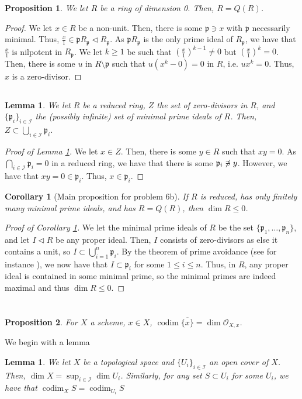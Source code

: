 \documentclass[english,letter,doublesided]{article}
\newcommand{\OO}{\mathcal{O}}
\newcommand{\pfr}{\mathfrak{p}}
\newcommand{\Ical}{\mathcal{I}}
\newenvironment{subproof}[1][\proofname]{%
	\renewcommand{\qedsymbol}{$\blacksquare$}%
	\begin{proof}[#1]%
	}{%
	\end{proof}%
}
\newcommand{\prob}[1]{\setcounter{section}{#1-1}\section{}}
\newcommand{\prt}[1]{\setcounter{subsection}{#1-1}\subsection{}}
\newtheorem{cor}[thm]{Corollary}
\newtheorem{lemma}[thm]{Lemma}
\newtheorem*{prop*}{Proposition}
\theoremstyle{remark}
\theoremstyle{definition}
\newcommand{\cl}{\overline}
\DeclareMathOperator{\codim}{codim}
\begin{document}

\prob{6}
\prt{1}
\begin{prop*}
We let $R$ be a ring of dimension 0. Then, $R=Q(R)$. 
\end{prop*}
\begin{proof}
	We let $x\in R$ be a non-unit. Then, there is some $\pfr\ni x$ with $\pfr$ necessarily minimal. Thus, $\frac{x}{1}\in \pfr R_\pfr\triangleleft R_\pfr$. As $\pfr R_\pfr$ is the only prime ideal of $R_\pfr$, we have that $\frac{x}{1}$ is nilpotent in $R_\pfr$. We let $k\geq 1$ be such that $(\frac{x}{1})^{k-1}\neq 0$ but $(\frac{x}{1})^k=0$. Then, there is some $u$ in $R\setminus \pfr$ such that $u(x^k-0)=0$ in $R$, i.e. $ux^k=0$. Thus, $x$ is a zero-divisor.
\end{proof}
\prt{2}
\begin{lemma}
	We let $R$ be a reduced ring, $Z$ the set of zero-divisors in $R$, and $\{\pfr_i\}_{i\in \Ical}$ the (possibly infinite) set of minimal prime ideals of $R$. Then, $Z\subset \bigcup_{i\in \Ical}\pfr_i$. \label{6blem}
\end{lemma}
\begin{subproof}[Proof of Lemma \ref{6blem}]
We let $x\in Z$. Then, there is some $y\in R$ such that $xy=0$. As $\bigcap_{i\in \Ical}\pfr_i=0$ in a reduced ring, we have that there is some $\pfr_i\centernot\ni y$. However, we have that $xy=0\in \pfr_i$. Thus, $x\in \pfr_i$. 
\end{subproof}
\begin{cor}[Main proposition for problem 6b]
	If $R$ is reduced, has only finitely many minimal prime ideals, and has $R=Q(R)$, then $\dim R\leq 0$. \label{6bcor}
\end{cor}
\begin{proof}[Proof of Corollary \ref{6bcor}]
	We let the minimal prime ideals of $R$ be the set $\{\pfr_1,\ldots,\pfr_n\}$, and let $I\triangleleft R$ be any proper ideal. Then, $I$ consists of zero-divisors as else it contains a unit, so $I\subset \bigcup_{i=1}^n\pfr_i$. By the theorem of prime avoidance (see for instance \cite[\S3.2]{eis}), we now have that $I\subset \pfr_i$ for some $1\leq i \leq n$. Thus, in $R$, any proper ideal is contained in some minimal prime, so the minimal primes are indeed maximal and thus $\dim R\leq 0$. 
\end{proof}
\prob{7}
\begin{prop*}
For $X$ a scheme, $x\in X$, $\codim \cl{\{x\}}=\dim \OO_{X,x}$.
\end{prop*}
We begin with a lemma
\begin{lemma}
	We let $X$ be a topological space and $\{U_i\}_{i\in \Ical}$ an open cover of $X$. Then, $\dim X=\sup_{i\in \Ical}\dim U_i$. Similarly, for any set $S\subset U_i$ for some $U_i$, we have that $\codim_XS=\codim_{U_i} S$ \label{7lemc}
\end{lemma}
\end{document}
